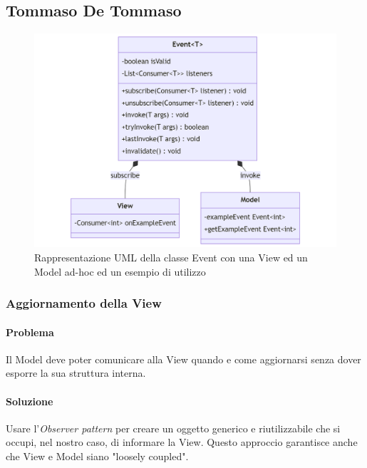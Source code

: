 \documentclass[a4paper,12pt]{report}
\begin{document}
\subsection*{Tommaso De Tommaso}
\begin{figure}[H]
	\centering{}
	\includegraphics[width=\textwidth]{img/Event.png}
	\caption{Rappresentazione UML della classe Event con una View ed un Model ad-hoc ed un esempio di utilizzo}
	\label{img:Event}
\end{figure}
\subsubsection*{Aggiornamento della View}
\paragraph{Problema} Il Model deve poter comunicare alla View quando e come aggiornarsi senza dover esporre la sua struttura interna.
\paragraph{Soluzione} Usare l'\textit{Observer pattern} per creare un oggetto generico e riutilizzabile che si occupi, nel nostro caso, di informare la View.
%
Questo approccio garantisce anche che View e Model siano "loosely coupled".
\end{document}
